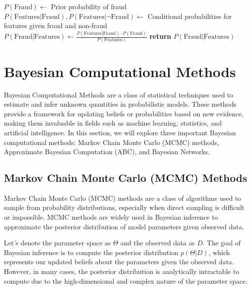 \documentclass[12pt]{book} %
\begin{document}
\FloatBarrier
\begin{algorithm}
\caption{Bayesian Classifier for Fraud Detection}\label{fraud_detection}
\begin{algorithmic}[1]
\State $P(\text{Fraud}) \gets$ Prior probability of fraud
\State $P(\text{Features} | \text{Fraud}), P(\text{Features} | \neg \text{Fraud}) \gets$ Conditional probabilities for features given fraud and non-fraud
\State $P(\text{Fraud} | \text{Features}) \gets \frac{P(\text{Features} | \text{Fraud}) \cdot P(\text{Fraud})}{P(\text{Features})}$
\State \textbf{return} $P(\text{Fraud} | \text{Features})$ 
\EndProcedure
\end{algorithmic}
\end{algorithm}
\FloatBarrier

\section{Bayesian Computational Methods}
Bayesian Computational Methods are a class of statistical techniques used to estimate and infer unknown quantities in probabilistic models. These methods provide a framework for updating beliefs or probabilities based on new evidence, making them invaluable in fields such as machine learning, statistics, and artificial intelligence. In this section, we will explore three important Bayesian computational methods: Markov Chain Monte Carlo (MCMC) methods, Approximate Bayesian Computation (ABC), and Bayesian Networks.

\subsection{Markov Chain Monte Carlo (MCMC) Methods}
Markov Chain Monte Carlo (MCMC) methods are a class of algorithms used to sample from probability distributions, especially when direct sampling is difficult or impossible. MCMC methods are widely used in Bayesian inference to approximate the posterior distribution of model parameters given observed data.

Let's denote the parameter space as $\Theta$ and the observed data as $D$. The goal of Bayesian inference is to compute the posterior distribution $p(\Theta|D)$, which represents our updated beliefs about the parameters given the observed data. However, in many cases, the posterior distribution is analytically intractable to compute due to the high-dimensional and complex nature of the parameter space.
\end{document}

